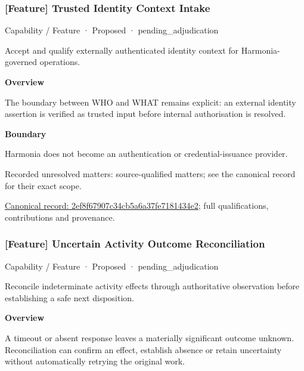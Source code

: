 \subsubsection{[Feature] Trusted Identity Context Intake}

\label{element:2ef8f67907c34cb5a6a37fe7181434e2}
{\small Capability / Feature · Proposed · pending\_adjudication}\par

Accept and qualify externally authenticated identity context for Harmonia-governed operations.



\textbf{Overview}



The boundary between WHO and WHAT remains explicit: an external identity assertion is verified as trusted input before internal authorisation is resolved.



\textbf{Boundary}



Harmonia does not become an authentication or credential-issuance provider.


{\small Recorded unresolved matters: source-qualified matters; see the canonical record for their exact scope.}\par
{\footnotesize \href{../../../../continuum/strategy/capability/feature/2ef8f67907c34cb5a6a37fe7181434e2.md}{Canonical record: 2ef8f67907c34cb5a6a37fe7181434e2}; full qualifications, contributions and provenance.}\par
\subsubsection{[Feature] Uncertain Activity Outcome Reconciliation}

\label{element:eb06ecc956404d0397701ceafb5fbd46}
{\small Capability / Feature · Proposed · pending\_adjudication}\par

Reconcile indeterminate activity effects through authoritative observation before establishing a safe next disposition.



\textbf{Overview}



A timeout or absent response leaves a materially significant outcome unknown. Reconciliation can confirm an effect, establish absence or retain uncertainty without automatically retrying the original work.



